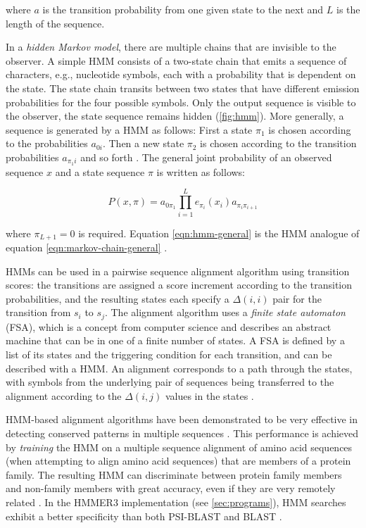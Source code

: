 where $a$ is the transition probability from one given state to the next and $L$
is the length of the sequence.

In a \emph{hidden Markov model}, there are multiple chains that are invisible to the
observer. A simple HMM consists of a two-state chain that emits a sequence of
characters, e.g., nucleotide symbols, each with a probability that is dependent
on the state. The state chain transits between two states that have different
emission probabilities for the four possible symbols. Only the output sequence
is visible to the observer, the state sequence remains hidden
(\autoref{fig:hmm}). More generally, a sequence is generated by a HMM as
follows: First a state $\pi_1$ is chosen according to the probabilities $a_{0i}$.
Then a new state $\pi_2$ is chosen according to the transition probabilities
$a_{\pi_{1}i}$ and so forth \citep{durbin1998}. The general joint probability of
an observed sequence $x$ and a state sequence $\pi$ is written as follows:

\begin{equation}
P(x,\pi) = a_{0\pi_1} \prod_{i=1}^L e_{\pi_i}(x_i)a_{\pi_i\pi_{i+1}}
\label{eqn:hmm-general}
\end{equation}

where $\pi_{L+1} = 0$ is required. Equation \eqref{eqn:hmm-general} is the HMM
analogue of equation \eqref{eqn:markov-chain-general} \citep{durbin1998}.



HMMs can be used in a pairwise sequence alignment algorithm using transition
scores: the transitions are assigned a score increment according to the
transition probabilities, and the resulting states each specify a $\Delta(i,i)$
pair for the transition from $s_i$ to $s_j$. The alignment algorithm uses a
\emph{finite state automaton} (FSA), which is a concept from computer science
and describes an abstract machine that can be in one of a finite number of
states. A FSA is defined by a list of its states and the triggering condition
for each transition, and can be described with a HMM. An alignment corresponds
to a path through the states, with symbols from the underlying pair of sequences
being transferred to the alignment according to the $\Delta(i,j)$ values in the
states \citep{durbin1998}. 

HMM-based alignment algorithms have been demonstrated to be very effective in
detecting conserved patterns in multiple sequences \citep{eddy1995, hughey1996}. 
This performance is achieved by \emph{training} the HMM on a multiple sequence
alignment of amino acid sequences (when attempting to align amino acid
sequences) that are members of a protein family. The resulting HMM can
discriminate between protein family members and non-family members with great
accuracy, even if they are very remotely related \citep{karplus1998}. In the
HMMER3 implementation (see \autoref{sec:programs}), HMM searches exhibit a
better specificity \citep{korf2004} than both PSI-BLAST \citep{altschul1997} and BLAST
\citep{altschul1990}.
